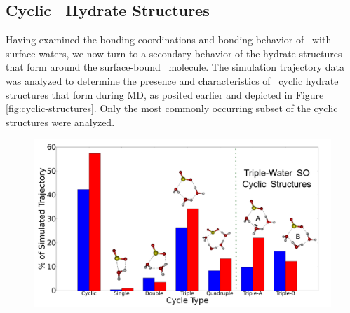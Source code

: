 \subsection{Cyclic \suldiox~Hydrate Structures}

Having examined the bonding coordinations and bonding behavior of \suldiox~with surface waters, we now turn to a secondary behavior of the hydrate structures that form around the surface-bound \suldiox~molecule. The simulation trajectory data was analyzed to determine the presence and characteristics of \suldiox~cyclic hydrate structures that form during MD, as posited earlier and depicted in Figure \ref{fig:cyclic-structures}. Only the most commonly occurring subset of the cyclic structures were analyzed. 

\begin{figure}[h!]
	\begin{center}
		\includegraphics[scale=1.0]{images/cycles/SO-cycle-breakdown-with-cartoons-small.png}
		\caption{}
		\label{fig:cyclic-breakdown}
	\end{center}
\end{figure}
